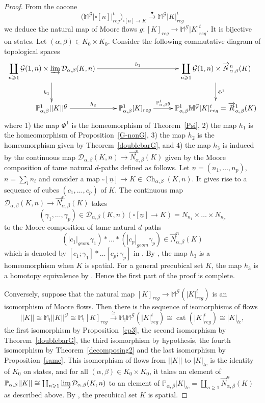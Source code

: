 \documentclass[a4paper,12pt]{amsart}
\makeatletter
\newcommand{\D}{\mathcal{D}}
\newcommand{\p}{\times}
\renewcommand{\vec}{\overrightarrow}
\renewcommand{\P}{\mathbb{P}}
\newcommand{\bpf}{\begin{proof}}
\newcommand{\epf}{\end{proof}}
\theoremstyle{definition}
\newcommand{\fr}[1]{\ar@{->}[r]^-{#1}}
\newcommand{\iso}{\cong}
\renewcommand{\geq}{\geqslant}
\newcommand{\moore}{{\mathbb{M}}}
\newcommand{\lmoore}{\mathbb{M}_!}
\DeclareMathOperator{\Ch}{Ch}
\DeclareMathOperator{\Cat}{\mathrm{cat}}
\newcommand{\liminj}{\varinjlim}
\renewcommand{\P}{\mathbb{P}}
\makeatother
\begin{document}
\bpf
From the cocone 
\[
\bigg(\moore^{\mathcal{G}}|\square[n]|^t_{reg}\bigg)_{\square[n]\to K} \stackrel{\bullet}\longrightarrow \moore^{\mathcal{G}}|K|^t_{reg}
\] 
we deduce the natural map of Moore flows $g:[K]_{reg} \longrightarrow \moore^{\mathcal{G}}|K|^t_{reg}$. It is bijective on states. Let $(\alpha,\beta)\in K_0\p K_0$. Consider the following commutative diagram of topological spaces
\[
\xymatrix@C=2.7em@R=3em
{
	\ar@{->}[d]_-{h_1}\displaystyle\coprod_{n\geq 1} \mathcal{G}(1,n) \p \liminj \D_{\alpha,\beta}(K,n) \ar@{->}[rr]^-{h_3} && \displaystyle\coprod_{n\geq 1} \mathcal{G}(1,n) \p \vec{N}^n_{\alpha,\beta}(K)\ar@{->}[d]^-{\Phi^1}\\
	\P_{\alpha,\beta}^1 ||K||^{\mathcal{G}} \fr{h_2}& \P_{\alpha,\beta}^1 [K]_{reg} \fr{\P_{\alpha,\beta}^1g}& \P_{\alpha,\beta}^1\moore^{\mathcal{G}}|K|^t_{reg} = \vec{R}^1_{\alpha,\beta}(K)
}
\]
where 1) the map $\Phi^1$ is the homeomorphism of Theorem~\ref{Psi}, 2) the map $h_1$ is the homeomorphism of Proposition~\ref{G-nonG}, 3) the map $h_2$ is the homeomorphism given by Theorem~\ref{doublebarG}, and 4) the map $h_3$ is induced by the continuous map $\D_{\alpha,\beta}(K,n)\to \vec{N}^n_{\alpha,\beta}(K)$ given by the Moore composition of tame natural $d$-paths defined as follows. Let $\underline{n}=(n_1,\dots,n_p)$, $n=\sum_i n_i$ and consider a map $\square[\underline{n}] \to K \in \Ch_{\alpha,\beta}(K,n)$. It gives rise to a sequence of cubes $(c_1,\dots,c_p)$ of $K$. The continuous map $\D_{\alpha,\beta}(K,n)\to \vec{N}^n_{\alpha,\beta}(K)$ takes \[(\gamma_1,\dots,\gamma_p)\in \D_{\alpha,\beta}(K,n)(\square[\underline{n}]\to K) = N_{n_1} \p \dots \p N_{n_p}\] to the Moore composition of tame natural $d$-paths \[(|c_1|_{geom}\gamma_1)*\dots *(|c_p|_{geom}\gamma_p)\in\vec{N}^n_{\alpha,\beta}(K)\] which is denoted by $[c_1;\gamma_1]*\dots [c_p;\gamma_p]$ in \cite{NaturalRealization}. By \cite[Theorem~7.7]{NaturalRealization}, the map $h_3$ is a homeomorphism when $K$ is spatial. For a general precubical set $K$, the map $h_3$ is a homotopy equivalence by \cite[Theorem~7.8]{NaturalRealization}. Hence the first part of the proof is complete.

Conversely, suppose that the natural map $[K]_{reg} \to \moore^{\mathcal{G}}(|K|^t_{reg})$ is an isomorphism of Moore flows. Then there is the sequence of isomorphisms of flows 
\[
||K||\iso \lmoore||K||^{\mathcal{G}}\iso \lmoore[K]_{reg} \stackrel{\iso} \longrightarrow \lmoore\moore^{\mathcal{G}}(|K|^t_{reg})\iso \Cat(|K|^t_{reg}) \iso |K|_{tc},
\]
the first isomorphism by Proposition~\ref{cp3}, the second isomorphism by Theorem~\ref{doublebarG}, the third isomorphism by hypothesis, the fourth isomorphism by Theorem~\ref{decomposing2} and the last isomorphism by Proposition~\ref{same}. This isomorphism of flows from $||K||$ to $|K|_{tc}$ is the identity of $K_0$ on states, and for all $(\alpha,\beta)\in K_0\p K_0$, it takes an element of $\P_{\alpha,\beta}||K|| \iso \coprod_{n\geq 1} \liminj \D_{\alpha,\beta}(K,n)$ to an element of $\P_{\alpha,\beta}|K|_{tc} = \coprod_{n\geq 1} \vec{N}^n_{\alpha,\beta}(K)$ as described above. By \cite[Theorem~A.2]{NaturalRealization}, the precubical set $K$ is spatial.
\epf
\end{document}
